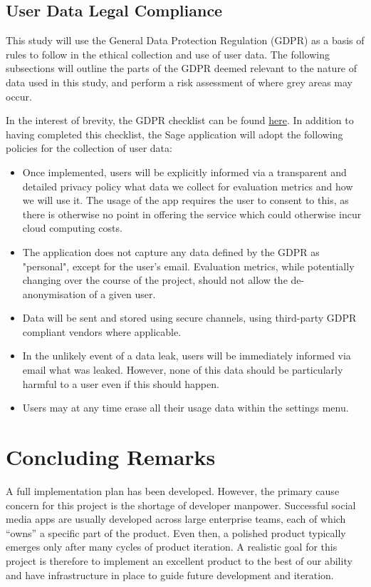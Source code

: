 \subsection{User Data Legal Compliance}
This study will use the General Data Protection Regulation (GDPR) as a basis of rules to follow in the ethical collection and use of user data. The following subsections will outline the parts of the GDPR deemed relevant to the nature of data used in this study, and perform a risk assessment of where grey areas may occur.

In the interest of brevity, the GDPR checklist can be found \href{https://gdpr.eu/checklist/}{here}. In addition to having completed this checklist, the Sage application will adopt the following policies for the collection of user data:

\begin{itemize}
    \item Once implemented, users will be explicitly informed via a transparent and detailed privacy policy what data we collect for evaluation metrics and how we will use it. The usage of the app requires the user to consent to this, as there is otherwise no point in offering the service which could otherwise incur cloud computing costs.
    \item The application does not capture any data defined by the GDPR as "personal", except for the user's email. Evaluation metrics, while potentially changing over the course of the project, should not allow the de-anonymisation of a given user.
    \item Data will be sent and stored using secure channels, using third-party GDPR compliant vendors where applicable.
    \item In the unlikely event of a data leak, users will be immediately informed via email what was leaked. However, none of this data should be particularly harmful to a user even if this should happen.
    \item Users may at any time erase all their usage data within the settings menu.
\end{itemize}

\section{Concluding Remarks}
A full implementation plan has been developed. However, the primary cause concern for this project is the shortage of developer manpower. Successful social media apps are usually developed across large enterprise teams, each of which ``owns'' a specific part of the product. Even then, a polished product typically emerges only after many cycles of product iteration. A realistic goal for this project is therefore to implement an excellent product to the best of our ability and have infrastructure in place to guide future development and iteration.
